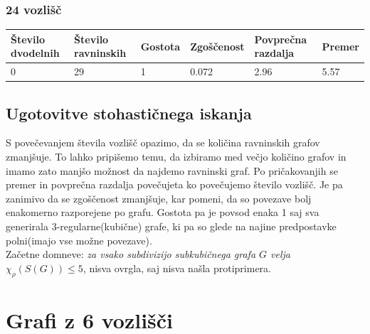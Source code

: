 \documentclass[11pt,a4paper,titlepage]{article}
\begin{document}
\subsubsection{24 vozlišč}
\begin{table}[H]
	\begin{tabular}{|l|l|l|l|l|l|}
		\hline
		Število dvodelnih	& Število ravninskih  & Gostota  & Zgoščenost & Povprečna razdalja & Premer \\ \hline
		0 & 29  & 1 & 0.072 & 2.96 & 5.57 \\ \hline
	\end{tabular}
\end{table}

\subsection{Ugotovitve stohastičnega iskanja}
S povečevanjem števila vozlišč opazimo, da se količina ravninskih grafov zmanjšuje. To lahko pripišemo temu, da izbiramo med večjo količino grafov in imamo zato manjšo možnost da najdemo ravninski graf. Po pričakovanjih se premer in povprečna razdalja povečujeta ko povečujemo število vozlišč. Je pa zanimivo da se zgoščenost zmanjšuje, kar pomeni, da so povezave bolj enakomerno razporejene po grafu. Gostota pa je povsod enaka 1 saj sva generirala 3-regularne(kubične) grafe, ki pa so glede na najine predpostavke polni(imajo vse možne povezave). \\
Začetne domneve: \emph{za vsako subdivizijo subkubičnega grafa $G$ velja $\chi_\rho(S(G)) \leq 5$}, nisva ovrgla, saj nisva našla protiprimera.

\nocite{*}

\printbibliography

\appendix
\section{Grafi z 6 vozlišči}
\end{document}

